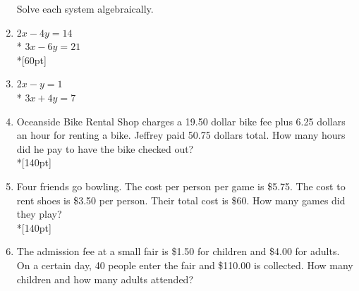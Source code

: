 \documentclass[12pt, oneside]{article}
\begin{document}
\begin{enumerate}
Solve each system algebraically.
\item
$2x-4y=14$\\*
$3x-6y=21$\\*[60pt]

\item 
$2x-y=1$\\*
$3x+4y=7$

\newpage
\item Oceanside Bike Rental Shop charges a 19.50 dollar bike fee plus 6.25 dollars an hour for renting a bike. Jeffrey paid 50.75 dollars total. How many hours did he pay to have the bike checked out?\\*[140pt]

\item Four friends go bowling. The cost per person per game is \$5.75. The cost to rent shoes is \$3.50 per person. Their total cost is \$60. How many games did they play?\\*[140pt]

\item The admission fee at a small fair is \$1.50 for children and \$4.00 for adults. On a certain day, 40 people enter the fair and \$110.00 is collected. How many children and how many adults attended?

\end{enumerate}
\end{document}
